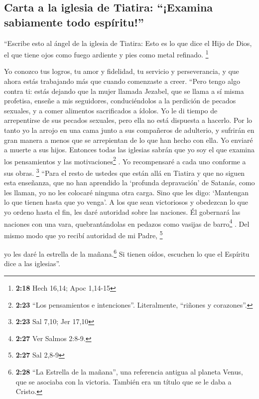 \hypertarget{carta-a-la-iglesia-de-tiatira-examina-sabiamente-todo-espuxedritu}{%
\subsection{Carta a la iglesia de Tiatira: ``¡Examina sabiamente todo
espíritu!''}\label{carta-a-la-iglesia-de-tiatira-examina-sabiamente-todo-espuxedritu}}

 ``Escribe esto al ángel de la iglesia de Tiatira: Esto
es lo que dice el Hijo de Dios, el que tiene ojos como fuego ardiente y
pies como metal refinado. \footnote{\textbf{2:18} Hech 16,14; Apoc
  1,14-15}

 Yo conozco tus logros, tu amor y fidelidad, tu servicio
y perseverancia, y que ahora estás trabajando más que cuando comenzaste
a creer.  ``Pero tengo algo contra ti: estás dejando que
la mujer llamada Jezabel, que se llama a sí misma profetisa, enseñe a
mis seguidores, conduciéndolos a la perdición de pecados sexuales, y a
comer alimentos sacrificados a ídolos.  Yo le di tiempo
de arrepentirse de sus pecados sexuales, pero ella no está dispuesta a
hacerlo.  Por lo tanto yo la arrojo en una cama junto a
sus compañeros de adulterio, y sufrirán en gran manera a menos que se
arrepientan de lo que han hecho con ella.  Yo enviaré a
muerte a sus hijos. Entonces todas las iglesias sabrán que yo soy el que
examina los pensamientos y las motivaciones\footnote{\textbf{2:23} ``Los
  pensamientos e intenciones''. Literalmente, ``riñones y corazones''.}
. Yo recompensaré a cada uno conforme a sus obras. \footnote{\textbf{2:23}
  Sal 7,10; Jer 17,10}  ``Para el resto de ustedes que
están allá en Tiatira y que no siguen esta enseñanza, que no han
aprendido la `profunda depravación' de Satanás, como les llaman, yo no
les colocaré ninguna otra carga. Sino que les digo: 
`Mantengan lo que tienen hasta que yo venga'.  A los que
sean victoriosos y obedezcan lo que yo ordeno hasta el fin, les daré
autoridad sobre las naciones.  Él gobernará las naciones
con una vara, quebrantándolas en pedazos como vasijas de
barro\footnote{\textbf{2:27} Ver Salmos 2:8-9.} . Del mismo modo que yo
recibí autoridad de mi Padre, \footnote{\textbf{2:27} Sal 2,8-9}

 yo les daré la estrella de la mañana.\footnote{\textbf{2:28}
  ``La Estrella de la mañana'', una referencia antigua al planeta Venus,
  que se asociaba con la victoria. También era un título que se le daba
  a Cristo.}  Si tienen oídos, escuchen lo que el
Espíritu dice a las iglesias''.

